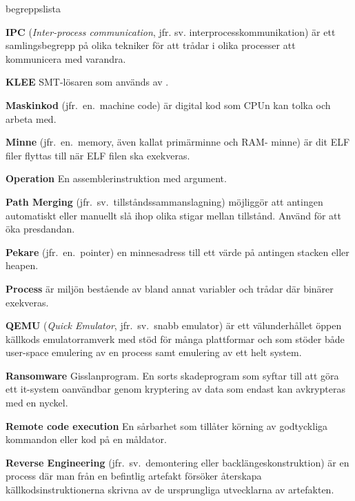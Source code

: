 \begin{labeling}{begreppslista}
    \item [\textbf{IPC}] (\emph{Inter-process communication}, jfr. sv.
          interprocesskommunikation) är ett samlingsbegrepp på olika tekniker för att
    trådar i olika processer att kommunicera med varandra.

    \item [\textbf{KLEE}] SMT-lösaren som används av \stoe{}.

    \item [\textbf{Maskinkod}] (jfr.\ en.\ machine code) är digital kod som CPUn
    kan tolka och arbeta med.

    \item [\textbf{Minne}] (jfr.\ en.\ memory, även kallat primärminne och RAM-
          minne) är dit ELF filer flyttas till när ELF filen ska exekveras.

    \item [\textbf{Operation}] En assemblerinstruktion med argument.

    \item [\textbf{Path Merging}] (jfr.\ sv.\ tillståndssammanslagning) möjliggör
    att antingen automatiskt eller manuellt slå ihop olika stigar mellan
    tillstånd.  Använd för att öka presdandan.

    \item [\textbf{Pekare}] (jfr.\ en.\ pointer) en minnesadress till ett värde på
    antingen stacken eller heapen.

    \item [\textbf{Process}] är miljön bestående av bland annat variabler och
    trådar där binärer exekveras.

    \item [\textbf{QEMU}] (\emph{Quick Emulator}, jfr.\ sv.\ snabb emulator) är
    ett välunderhållet öppen källkods emulatorramverk med stöd för många
    plattformar och som stöder både user-space emulering av en process samt
    emulering av ett helt system.

    \item [\textbf{Ransomware}] Gisslanprogram. En sorts skadeprogram som syftar
    till att göra ett it-system oanvändbar genom kryptering av data som endast
    kan avkrypteras med en nyckel.

    \item [\textbf{Remote code execution}] En sårbarhet som tillåter körning av
    godtyckliga kommandon eller kod på en måldator.

    \item [\textbf{Reverse Engineering}] (jfr.\ sv.\ demontering eller
          backlängeskonstruktion) är en process där man från en befintlig artefakt
    försöker återskapa källkodsinstruktionerna skrivna av de ursprungliga
    utvecklarna av artefakten.


\end{labeling}

